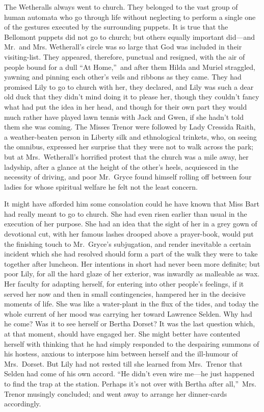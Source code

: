 \documentclass[12pt,a4paper]{book}
\begin{document}
The Wetheralls always went to church. They belonged to the vast
group of human automata who go through life without neglecting to
perform a single one of the gestures executed by the surrounding
puppets. It is true that the Bellomont puppets did not go to
church; but others equally important did---and Mr.\ and Mrs.
Wetherall's circle was so large that God was included in their
visiting-list. They appeared, therefore, punctual and resigned,
with the air of people bound for a dull ``At Home,''\ and after them
Hilda and Muriel straggled, yawning and pinning each other's
veils and ribbons as they came. They had promised Lily to go to
church with her, they declared, and Lily was such a dear old duck
that they didn't mind doing it to please her, though they
couldn't fancy what had put the idea in her head, and though for
their own part they would much rather have played lawn tennis
with Jack and Gwen, if she hadn't told them she was coming. The
Misses Trenor were followed by Lady Cressida Raith, a
weather-beaten person in Liberty silk and ethnological trinkets,
who, on seeing the omnibus, expressed her surprise that they were
not to walk across the park; but at Mrs.\ Wetherall's horrified
protest that the church was a mile away, her ladyship,
after a glance at the height of the other's heels, acquiesced in
the necessity of driving, and poor Mr.\ Gryce found himself
rolling off between four ladies for whose spiritual welfare he
felt not the least concern.





It might have afforded him some consolation could he have known
that Miss Bart had really meant to go to church. She had even
risen earlier than usual in the execution of her purpose. She had
an idea that the sight of her in a grey gown of devotional cut,
with her famous lashes drooped above a prayer-book, would put the
finishing touch to Mr.\ Gryce's subjugation, and render inevitable
a certain incident which she had resolved should form a part of
the walk they were to take together after luncheon. Her
intentions in short had never been more definite; but poor Lily,
for all the hard glaze of her exterior, was inwardly as malleable
as wax. Her faculty for adapting herself, for entering into other
people's feelings, if it served her now and then in small
contingencies, hampered her in the decisive moments of life. She
was like a water-plant in the flux of the tides, and today the
whole current of her mood was carrying her toward Lawrence
Selden. Why had he come? Was it to see herself or Bertha Dorset? 
It was the last question which, at that moment, should have
engaged her. She might better have contented herself with
thinking that he had simply responded to the despairing summons
of his hostess, anxious to interpose him between herself and the
ill-humour of Mrs.\ Dorset. But Lily had not rested till she
learned from Mrs.\ Trenor that Selden had come of his own accord. 
``He didn't even wire me---he just happened to find the trap at the
station. Perhaps it's not over with Bertha after all,''\ Mrs.
Trenor musingly concluded; and went away to arrange her
dinner-cards accordingly.
\end{document}
